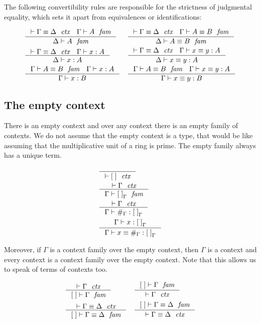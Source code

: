 The following convertibility rules are responsible for the strictness
of judgmental equality, which sets it apart from equivalences or identifications:

\begin{align*}
& \inference
  {\jctxeq{\Gamma}{\Delta}
   \jfam{\Gamma}{A}}
  {\jfam{\Delta}{A}}
& & \inference
    {\jctxeq{\Gamma}{\Delta}
     \jfameq{\Gamma}{A}{B}}
    {\jfameq{\Delta}{A}{B}}\\
& \inference
  {\jctxeq{\Gamma}{\Delta}
   \jterm{\Gamma}{A}{x}}
  {\jterm{\Delta}{A}{x}}
& & \inference
    {\jctxeq{\Gamma}{\Delta}
     \jtermeq{\Gamma}{A}{x}{y}}
    {\jtermeq{\Delta}{A}{x}{y}}\\
& \inference
  {\jfameq{\Gamma}{A}{B}
   \jterm{\Gamma}{A}{x}}
  {\jterm{\Gamma}{B}{x}}
& & \inference
    {\jfameq{\Gamma}{A}{B}
     \jtermeq{\Gamma}{A}{x}{y}}
    {\jtermeq{\Gamma}{B}{x}{y}}
\end{align*}

\subsection{The empty context}
There is an empty context and over any context there is an empty family of
contexts. We do not assume that the empty context is a type, that would be like
assuming that the multiplicative unit of a ring is prime. The empty family
always has a unique term. 

\begin{align}
& \inference
  {}
  {\jctx{\emptyc}}\\
& \inference
  {\jctx{\Gamma}}
  {\jfam{\Gamma}{\emptyf[\Gamma]}}\\
& \inference
  {\jctx{\Gamma}}
  {\jterm{\Gamma}{\emptyf[\Gamma]}{\emptytm[\Gamma]}}\\
& \inference
  {\jterm{\Gamma}{\emptyf[\Gamma]}{x}}
  {\jtermeq{\Gamma}{\emptyf[\Gamma]}{x}{\emptytm[\Gamma]}}
\end{align}

Moreover, if $\Gamma$ is a context family over the
empty context, then $\Gamma$ is a context and every context is a context
family over the empty context. Note that this allows us to speak
of terms of contexts too.

\begin{align}
& \inference
  {\jctx{\Gamma}}
  {\jfam{\emptyc}{\Gamma}} 
& & \inference
    {\jfam{\emptyc}{\Gamma}}
    {\jctx{\Gamma}}\\
& \inference
  {\jctxeq{\Gamma}{\Delta}}
  {\jfameq{\emptyc}{\Gamma}{\Delta}}
& & \inference
    {\jfameq{\emptyc}{\Gamma}{\Delta}}
    {\jctxeq{\Gamma}{\Delta}}
\end{align}

